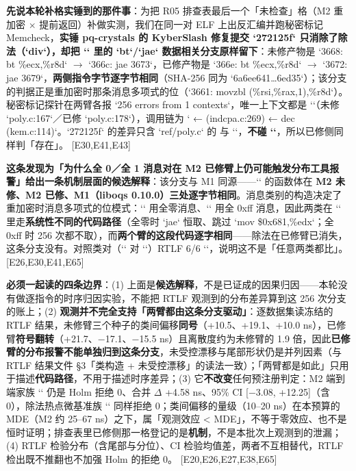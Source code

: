\documentclass[UTF8,fontset=fandol,11pt,a4paper]{ctexart}
\begin{document}
\textbf{先说本轮补格实锤到的那件事}：为把 R05 排查表最后一个「未检查」格（M2 重加密 \texorpdfstring{$\times$}{x} 提前返回）补做实测，我们在同一对 ELF 上出反汇编并跑秘密标记 Memcheck，\textbf{实锤 pq-crystals 的 KyberSlash 修复提交 `272125f` 只消除了除法（`div`），却把 `\texttt{}` 里的 `bt`/`jae` 数据相关分支原样留下}：未修产物是 `3668: bt \%ecx,\%r8d` \texorpdfstring{$\rightarrow$}{->} `366c: jae 3673`，已修产物是 `366e: bt \%ecx,\%r8d` \texorpdfstring{$\rightarrow$}{->} `3672: jae 3679`，\textbf{两侧指令字节逐字节相同}（SHA-256 同为 `6a6ee641…6ed35`）；该分支的判据正是重加密时那条消息多项式的位（`3661: movzbl (\%rsi,\%rax,1),\%r8d`）。秘密标记探针在两臂各报 `256 errors from 1 contexts`，唯一上下文都是 `\texttt{}`（未修 `poly.c:167`／已修 `poly.c:178`），调用链为 `\texttt{} ← \texttt{} (indcpa.c:269) ← dec (kem.c:114)`。`272125f` 的差异只含 `ref/poly.c` 的 \texttt{} 与 `\texttt{}`，\textbf{不碰 `\texttt{}`}，所以已修侧同样判「存在」。 [E30,E41,E43]


\textbf{这条发现为「为什么全 0／全 1 消息对在 M2 已修臂上仍可能触发分布工具报警」给出一条机制层面的候选解释}：该分支与 M1 同源——`\texttt{}` 的函数体在 \textbf{M2 未修、M2 已修、M1（liboqs 0.10.0）三处逐字节相同}。消息类别的构造决定了重加密时消息多项式的位模式：`\texttt{}` 用全零消息、`\texttt{}` 用全 0xff 消息，因此两类在 `\texttt{}` 里走\textbf{系统性不同的代码路径}（全零时 `jae` 恒取、跳过 `mov \$0x681,\%edx`；全 0xff 时 256 次都不取），而\textbf{两个臂的这段代码逐字相同}——除法在已修臂已消失，这条分支没有。对照类对（`\texttt{}` 对 `\texttt{}`）RTLF 6/6 `\texttt{}`，说明这不是「任意两类都比」。 [E26,E30,E41,E65]


\textbf{必须一起读的四条边界}：(1) 上面是\textbf{候选解释}，不是已证成的因果归因——本轮没有做逐指令的时序归因实验，不能把 RTLF 观测到的分布差异算到这 256 次分支的账上；(2) \textbf{观测并不完全支持「两臂都由这条分支驱动」}：逐数据集读冻结的 RTLF 结果，未修臂三个种子的类间偏移\textbf{同号}（+10.5、+19.1、+10.0 ns），已修臂\textbf{符号翻转}（+21.7、\texorpdfstring{$-$}{-}17.1、\texorpdfstring{$-$}{-}15.5 ns）且离散度约为未修臂的 1.9 倍，因此\textbf{已修臂的分布报警不能单独归到这条分支}，未受控漂移与尾部形状仍是并列因素（与 RTLF 结果文件 §3「类构造 + 未受控漂移」的读法一致）；「两臂都是如此」只用于描述\textbf{代码路径}，不用于描述时序差异；(3) 它\textbf{不改变}任何预注册判定：M2 端到端家族 `\texttt{}` 仍是 Holm 拒绝 0、合并 \texorpdfstring{$\Delta$}{Delta} +4.58 ns、95\% CI [\texorpdfstring{$-$}{-}3.08, +12.25]（含 0），除法热点微基准族 `\texttt{}` 同样拒绝 0；类间偏移的量级（10–20 ns）在本预算的 MDE（M2 约 25–67 ns）之下，属「观测效应 < MDE」，不等于零效应、也不是恒时证明；排查表里已修侧那一格登记的是\textbf{机制}，不是本批次上观测到的泄漏；(4) RTLF 检验分布（含尾部与分位）、CI 检验均值差，两者不互相替代，RTLF 检出既不推翻也不加强 Holm 的拒绝 0。 [E20,E26,E27,E38,E65]
\end{document}
